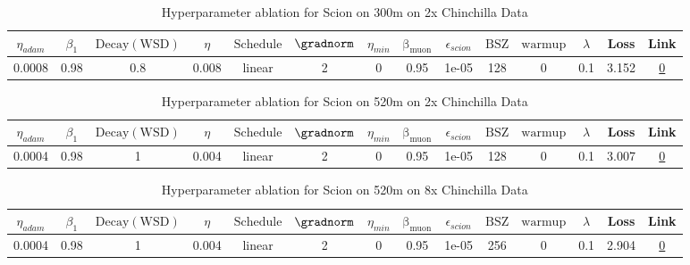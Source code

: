 \begin{table}[H]
\centering
\caption{Hyperparameter ablation for Scion on 300m on 2x Chinchilla Data}
\label{tab:ablation_scion_300m_2}
\begin{tabular}{cccccccccccccc}
\toprule
$\eta_{adam}$ & $\beta_1$ & $\mathrm{Decay (WSD)}$ & $\eta$ & $\mathrm{Schedule}$ & $\gradnorm$ & $\eta_{min}$ & $\mathrm{\beta_{muon}}$ & $\epsilon_{scion}$ & $\mathrm{BSZ}$ & $\mathrm{warmup}$ & $\lambda$ & Loss & Link \\
\midrule
0.0008 & 0.98 & 0.8 & 0.008 & linear & 2 & 0 & 0.95 & 1e-05 & 128 & 0 & 0.1 & 3.152 & \href{https://wandb.ai/stanford-mercury/optimizer-scaling/runs/sweep-300m-12B-scion4b55fclr0.008-wd0.1-minlr0-warmup0-b10.98-gn-2aec1d}{0} \\
\midrule
\bottomrule
\end{tabular}
\end{table}

\begin{table}[H]
\centering
\caption{Hyperparameter ablation for Scion on 520m on 2x Chinchilla Data}
\label{tab:ablation_scion_520m_2}
\begin{tabular}{cccccccccccccc}
\toprule
$\eta_{adam}$ & $\beta_1$ & $\mathrm{Decay (WSD)}$ & $\eta$ & $\mathrm{Schedule}$ & $\gradnorm$ & $\eta_{min}$ & $\mathrm{\beta_{muon}}$ & $\epsilon_{scion}$ & $\mathrm{BSZ}$ & $\mathrm{warmup}$ & $\lambda$ & Loss & Link \\
\midrule
0.0004 & 0.98 & 1 & 0.004 & linear & 2 & 0 & 0.95 & 1e-05 & 128 & 0 & 0.1 & 3.007 & \href{https://wandb.ai/stanford-mercury/optimizer-scaling/runs/sweep-520m-21B-scioni268e92lr0.004-wd0.1-minlr0-warmup0-b10.98-g-a22c53}{0} \\
\midrule
\bottomrule
\end{tabular}
\end{table}

\begin{table}[H]
\centering
\caption{Hyperparameter ablation for Scion on 520m on 8x Chinchilla Data}
\label{tab:ablation_scion_520m_8}
\begin{tabular}{cccccccccccccc}
\toprule
$\eta_{adam}$ & $\beta_1$ & $\mathrm{Decay (WSD)}$ & $\eta$ & $\mathrm{Schedule}$ & $\gradnorm$ & $\eta_{min}$ & $\mathrm{\beta_{muon}}$ & $\epsilon_{scion}$ & $\mathrm{BSZ}$ & $\mathrm{warmup}$ & $\lambda$ & Loss & Link \\
\midrule
0.0004 & 0.98 & 1 & 0.004 & linear & 2 & 0 & 0.95 & 1e-05 & 256 & 0 & 0.1 & 2.904 & \href{https://wandb.ai/stanford-mercury/optimizer-scaling/runs/sweep-520m-85B-scionbe58eblr0.004-wd0.1-minlr0-warmup0-b10.98-gn-7658bc}{0} \\
\midrule
\bottomrule
\end{tabular}
\end{table}

